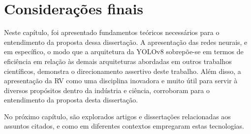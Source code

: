 \section{Considerações finais}

Neste capítulo, foi apresentado fundamentos teóricos necessários para o entendimento da proposta dessa dissertação. A apresentação das redes neurais, e em específico, o modo que a arquitetura da YOLOv8 sobrepõe-se em termos de eficiência em relação às demais arquiteturas abordadas em outros trabalhos científicos, demonstra o direcionamento assertivo deste trabalho. Além disso, a apresentação da RV como uma disciplina inovadora e muito útil para servir à diversos propósitos dentro da indústria e ciência, corroboram para o entendimento da proposta desta dissertação.

No próximo capítulo, são explorados artigos e dissertações relacionadas aos assuntos citados, e como em diferentes contextos empregaram estas tecnologias. 







